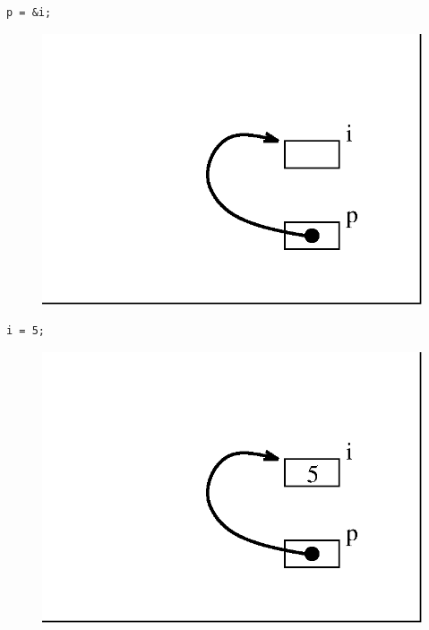 \documentclass[a4,portraitt]{slides}
\begin{document}
{\samepage
\begin{verbatim}
p = &i;
\end{verbatim}
\begin{center}
\begin{figure}[h]
\centerline{
\includegraphics{../Figs/point8_3.eps}
}
\end{figure}
\end{center}
\begin{verbatim}
i = 5;
\end{verbatim}
\begin{center}
\begin{figure}[h]
\centerline{
\includegraphics{../Figs/point8_4.eps}
}
\end{figure}
\end{center}
}
\end{document}
